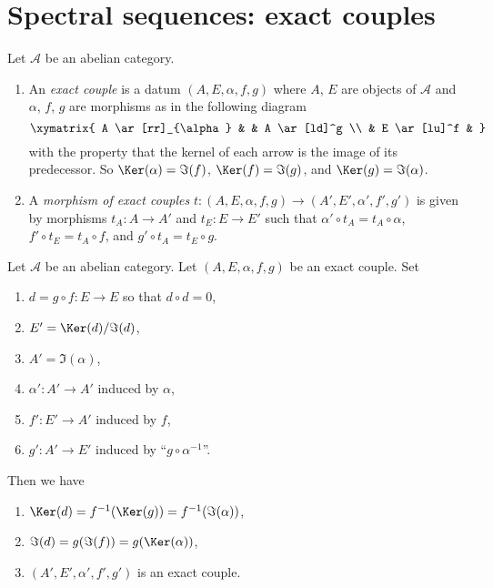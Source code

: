 \section{Spectral sequences: exact couples}
\label{section-exact-couple}

\begin{definition}
\label{definition-exact-couple}
Let $\mathcal{A}$ be an abelian category.
\begin{enumerate}
\item An {\it exact couple} is a datum $(A, E, \alpha, f, g)$ where
$A$, $E$ are objects of $\mathcal{A}$ and $\alpha$, $f$, $g$
are morphisms as in the following diagram
$$
\xymatrix{
A \ar[rr]_{\alpha} & & A \ar[ld]^g \\
& E \ar[lu]^f &
}
$$
with the property that the kernel of each arrow is the image
of its predecessor. So $\Ker(\alpha) = \Im(f)$,
$\Ker(f) = \Im(g)$, and $\Ker(g) = \Im(\alpha)$.
\item A {\it morphism of exact couples}
$t : (A, E, \alpha, f, g) \to (A', E', \alpha', f', g')$
is given by morphisms $t_A : A \to A'$ and
$t_E : E \to E'$ such that
$\alpha' \circ t_A = t_A \circ \alpha$,
$f' \circ t_E = t_A \circ f$, and
$g' \circ t_A = t_E \circ g$.
\end{enumerate}
\end{definition}

\begin{lemma}
\label{lemma-derived-exact-couple}
Let $\mathcal{A}$ be an abelian category.
Let $(A, E, \alpha, f, g)$ be an exact couple.
Set
\begin{enumerate}
\item $d = g \circ f : E \to E$ so that $d \circ d = 0$,
\item $E' = \Ker(d)/\Im(d)$,
\item $A' = \Im(\alpha)$,
\item $\alpha' : A' \to A'$ induced by $\alpha$,
\item $f' : E' \to A'$ induced by $f$,
\item $g' : A' \to E'$ induced by ``$g \circ \alpha^{-1}$''.
\end{enumerate}
Then we have
\begin{enumerate}
\item $\Ker(d) = f^{-1}(\Ker(g)) = f^{-1}(\Im(\alpha))$,
\item $\Im(d) = g(\Im(f)) = g(\Ker(\alpha))$,
\item $(A', E', \alpha', f', g')$ is an exact couple.
\end{enumerate}
\end{lemma}

